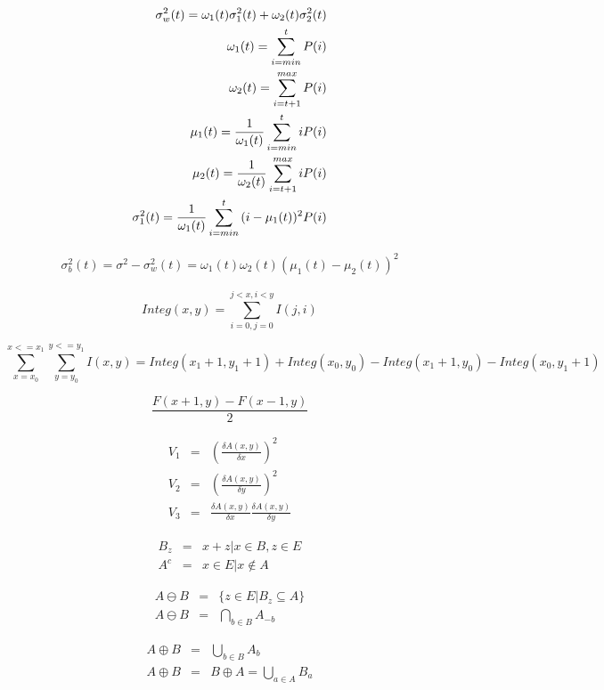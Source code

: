 \documentclass{article}
\begin{document}
\begin{eqnarray} \sigma^2_w(t)=\omega_1(t)\sigma^2_1(t)+\omega_2(t)\sigma^2_2(t) \\ \omega_1(t)=\sum_{i=min}^t P(i) \\ \omega_2(t)=\sum_{i=t+1}^{max} P(i) \\ \mu_1(t)= {1 \over \omega_1(t)} \sum_{i=min}^t {i P(i)} \\ \mu_2(t)= {1 \over \omega_2(t)} \sum_{i=t+1}^{max} {i P(i)} \\ \sigma^2_1(t) = {1 \over \omega_1(t)} \sum_{i=min}^t {(i - \mu_1(t))^2 P(i)} \end{eqnarray}
\pagebreak

\begin{eqnarray} \sigma^2_b(t)=\sigma^2-\sigma^2_w(t)=\omega_1(t)\omega_2(t) (\mu_1(t)-\mu_2(t))^2 \end{eqnarray}
\pagebreak

\[ Integ(x,y) = \sum_{i=0, j=0}^{j<x,i<y} I(j,i) \]
\pagebreak

\[ \sum_{x=x_0}^{x <= x_1}\sum_{y=y_0}^{y <= y_1} I(x,y) = Integ(x_1 + 1, y_1 + 1) + Integ(x_0, y_0) - Integ(x_1 + 1, y_0) - Integ(x_0, y_1 + 1) \]
\pagebreak

\[ \frac { F(x+1,y)-F(x-1,y) } {2} \]
\pagebreak

\begin{eqnarray*} V_1 &=& \left( \frac {\delta A(x,y)} {\delta x} \right)^2 \\ V_2 &=& \left( \frac {\delta A(x,y)} {\delta y} \right)^2 \\ V_3 &=& \frac {\delta A(x,y)} {\delta x} \frac {\delta A(x,y)} {\delta y} \end{eqnarray*}
\pagebreak

\begin{eqnarray*} B_z &=& {x + z | x \in B}, z \in E \\ A^c &=& {x \in E | x \not \in A} \end{eqnarray*}
\pagebreak

\begin{eqnarray*} A \ominus B &=& \{z\in E | B_{z} \subseteq A\} \\ A \ominus B &=& \bigcap_{b\in B} A_{-b} \end{eqnarray*}
\pagebreak

\begin{eqnarray*} A \oplus B &=& \bigcup_{b\in B} A_b \\ A \oplus B &=& B\oplus A = \bigcup_{a\in A} B_a \end{eqnarray*}
\pagebreak
\end{document}
